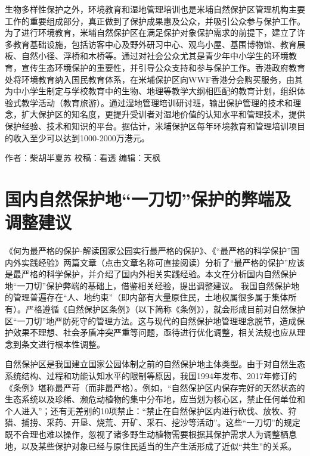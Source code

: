 \documentclass[
]{book}
\begin{document}
生物多样性保护之外，环境教育和湿地管理培训也是米埔自然保护区管理机构主要工作的重要组成部分，真正做到了保护成果惠及公众，并吸引公众参与保护工作。为了进行环境教育，米埔自然保护区在满足保护对象保护需求的前提下，建立了许多教育基础设施，包括访客中心及野外研习中心、观鸟小屋、基围博物馆、教育展板、自然小径、浮桥和木桥等。通过对社会公众尤其是青少年中小学生的环境教育，宣传生态环境保护的重要性，并引导公众支持和参与保护工作。香港政府教育处将环境教育纳入国民教育体系，在米埔保护区向WWF香港分会购买服务，由其为中小学生制定与学校教育中的生物、地理等教学大纲相匹配的教育计划，组织体验式教学活动（教育旅游）。通过湿地管理培训研讨班，输出保护管理的技术和理念，扩大保护区的知名度，更提升受训者对湿地价值的认知水平和管理技术，提供保护经验、技术和知识的平台。据估计，米埔保护区每年环境教育和管理培训项目的收入至少可以达到1000-2000万港元。

作者：柴胡半夏苏
校稿：看透
编辑：天枫

\hypertarget{ux56fdux5185ux81eaux7136ux4fddux62a4ux5730ux4e00ux5200ux5207ux4fddux62a4ux7684ux5f0aux7aefux53caux8c03ux6574ux5efaux8bae}{%
\section{国内自然保护地``一刀切''保护的弊端及调整建议}\label{ux56fdux5185ux81eaux7136ux4fddux62a4ux5730ux4e00ux5200ux5207ux4fddux62a4ux7684ux5f0aux7aefux53caux8c03ux6574ux5efaux8bae}}

《何为最严格的保护-解读国家公园实行最严格的保护》、《``最严格的科学保护''国内外实践经验》两篇文章（点击文章名称可直接阅读）分析了``最严格的保护''应该是最严格的科学保护，并介绍了国内外相关实践经验。本文在分析国内自然保护地``一刀切''保护弊端的基础上，借鉴相关经验，提出调整建议。
我国自然保护地的管理普遍存在``人、地约束''（即内部有大量原住民，土地权属很多属于集体所有）。严格遵循《自然保护区条例》（以下简称《条例》），就会形成目前对自然保护区``一刀切''地严防死守的管理方法。这与现代的自然保护地管理理念脱节，造成保护效果不理想、社会矛盾冲突严重等问题，亟待进行优化调整，相关法规也应从理念到条文进行根本性调整。

自然保护区是我国建立国家公园体制之前的自然保护地主体类型。由于对自然生态系统结构、过程和功能认知水平的限制等原因，我国1994年发布、2017年修订的《条例》堪称最严苛（而非最严格）。例如，``自然保护区内保存完好的天然状态的生态系统以及珍稀、濒危动植物的集中分布地，应当划为核心区，禁止任何单位和个人进入''；还有无差别的10项禁止：``禁止在自然保护区内进行砍伐、放牧、狩猎、捕捞、采药、开垦、烧荒、开矿、采石、挖沙等活动''。这些``一刀切''的规定既不合理也难以操作，忽视了诸多野生动植物需要根据其保护需求人为调整栖息地，以及某些保护对象已经与原住民适当的生产生活形成了近似``共生''的关系。
\end{document}
